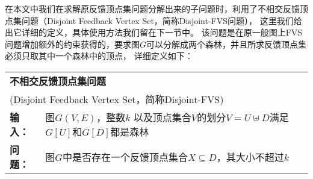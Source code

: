 在本文中我们在求解原反馈顶点集问题分解出来的子问题时，利用了不相交反馈顶点集问题（Disjoint Feedback Vertex Set，简称Disjoint-FVS问题），
这里我们给出它详细的定义，具体使用方法我们留在下一节中。
该问题是在原一般图上FVS问题增加额外的约束获得的，要求图$G$可以分解成两个森林，并且所求反馈顶点集必须只取其中一个森林中的顶点，
详细定义如下：\\

\begin{tabular}{ | p{0.06\headwidth} p{0.80\headwidth} | }
  \hline
  \multicolumn{2}{|l|}{ \textbf{不相交反馈顶点集问题} }\\
  \multicolumn{2}{|l|}{ (Disjoint Feedback Vertex Set，简称Disjoint-FVS)}\\
  \textbf{输入：} & 图$G(V, E)$，整数$k$ 以及顶点集合$V$的划分$V = U \uplus D$满足$G[U]$和$G[D]$都是森林\\
  \textbf{问题：} & 图$G$中是否存在一个反馈顶点集合$X \subseteq D$，其大小不超过$k$\\
  \hline
\end{tabular} \vspace{0.5cm}

